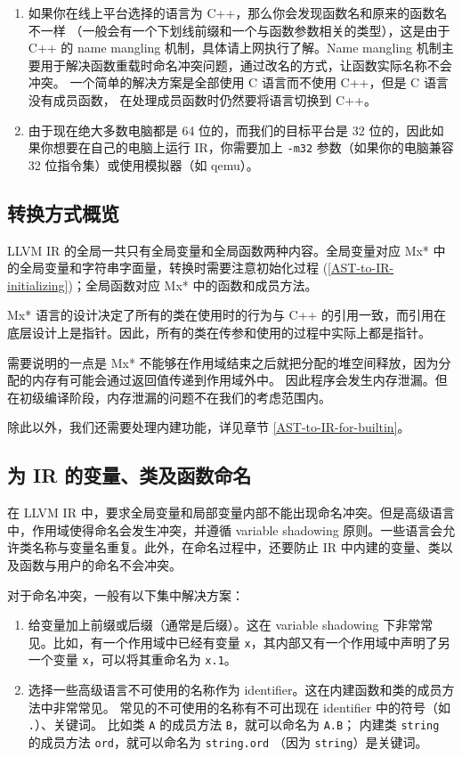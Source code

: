 \begin{remark}
\begin{enumerate}
  \item 如果你在线上平台选择的语言为 C++，那么你会发现函数名和原来的函数名不一样
    （一般会有一个下划线前缀和一个与函数参数相关的类型），这是由于
    C++ 的 name mangling 机制，具体请上网执行了解。Name mangling
    机制主要用于解决函数重载时命名冲突问题，通过改名的方式，让函数实际名称不会冲突。
    一个简单的解决方案是全部使用 C 语言而不使用 C++，但是 C 语言没有成员函数，
    在处理成员函数时仍然要将语言切换到 C++。
  \item 由于现在绝大多数电脑都是 64 位的，而我们的目标平台是 32
    位的，因此如果你想要在自己的电脑上运行 IR，你需要加上 \texttt{-m32} 参数（如果你的电脑兼容
    32 位指令集）或使用模拟器（如 qemu）。
\end{enumerate}
\end{remark}

\subsection{转换方式概览}\label{AST-to-IR-details}

LLVM IR 的全局一共只有全局变量和全局函数两种内容。全局变量对应 Mx*
中的全局变量和字符串字面量，转换时需要注意初始化过程
(\ref{AST-to-IR-initializing})；全局函数对应 Mx* 中的函数和成员方法。

Mx* 语言的设计决定了所有的类在使用时的行为与 C++
的引用一致，而引用在底层设计上是指针。因此，所有的类在传参和使用的过程中实际上都是指针。

需要说明的一点是 Mx* 不能够在作用域结束之后就把分配的堆空间释放，因为分配的内存有可能会通过返回值传递到作用域外中。
因此程序会发生内存泄漏。但在初级编译阶段，内存泄漏的问题不在我们的考虑范围内。

除此以外，我们还需要处理内建功能，详见章节
\ref{AST-to-IR-for-builtin}。

\subsection{为 IR 的变量、类及函数命名}\label{AST-to-IR-naming}

在 LLVM IR 中，要求全局变量和局部变量内部不能出现命名冲突。但是高级语言中，作用域使得命名会发生冲突，并遵循
variable shadowing 原则。一些语言会允许类名称与变量名重复。此外，在命名过程中，还要防止
IR 中内建的变量、类以及函数与用户的命名不会冲突。

对于命名冲突，一般有以下集中解决方案：
\begin{enumerate}
 \item 给变量加上前缀或后缀（通常是后缀）。这在 variable shadowing 下非常常见。比如，有一个作用域中已经有变量
   \texttt x，其内部又有一个作用域中声明了另一个变量 \texttt x，可以将其重命名为
   \texttt{x.1}。
 \item 选择一些高级语言不可使用的名称作为 identifier。这在内建函数和类的成员方法中非常常见。
   常见的不可使用的名称有不可出现在 identifier 中的符号（如 \texttt{.}）、关键词。
   比如类 \texttt A 的成员方法 \texttt{B}，就可以命名为 \texttt{A.B}；
   内建类 \texttt{string} 的成员方法 \texttt{ord}，就可以命名为 \texttt{string.ord}
   （因为 \texttt{string}）是关键词。
\end{enumerate}

